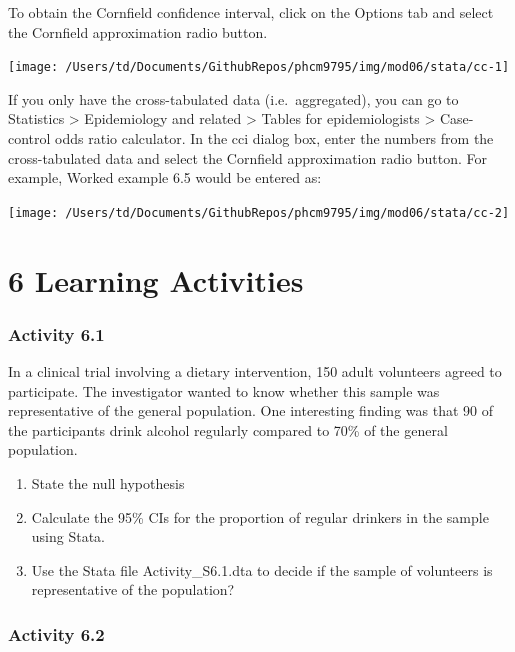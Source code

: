 \documentclass[
]{memoir}
\providecommand{\tightlist}{%
  \setlength{\itemsep}{0pt}\setlength{\parskip}{0pt}}
\begin{document}
To obtain the Cornfield confidence interval, click on the Options tab and select the Cornfield approximation radio button.

\texttt{[image: /Users/td/Documents/GithubRepos/phcm9795/img/mod06/stata/cc-1]}

If you only have the cross-tabulated data (i.e.~aggregated), you can go to Statistics \textgreater{} Epidemiology and related \textgreater{} Tables for epidemiologists \textgreater{} Case-control odds ratio calculator. In the cci dialog box, enter the numbers from the cross-tabulated data and select the Cornfield approximation radio button. For example, Worked example 6.5 would be entered as:

\texttt{[image: /Users/td/Documents/GithubRepos/phcm9795/img/mod06/stata/cc-2]}

\hypertarget{learning-activities-5}{%
\chapter*{\texorpdfstring{\textbf{6} Learning Activities}{6 Learning Activities}}\label{learning-activities-5}}

\hypertarget{activity-6.1}{%
\subsection*{Activity 6.1}\label{activity-6.1}}

In a clinical trial involving a dietary intervention, 150 adult volunteers agreed to participate. The investigator wanted to know whether this sample was representative of the general population. One interesting finding was that 90 of the participants drink alcohol regularly compared to 70\% of the general population.

\begin{enumerate}
\def\labelenumi{\alph{enumi})}
\tightlist
\item
  State the null hypothesis
\item
  Calculate the 95\% CIs for the proportion of regular drinkers in the sample using Stata.
\item
  Use the Stata file Activity\_S6.1.dta to decide if the sample of volunteers is representative of the population?
\end{enumerate}

\hypertarget{activity-6.2}{%
\subsection*{Activity 6.2}\label{activity-6.2}}
\end{document}
